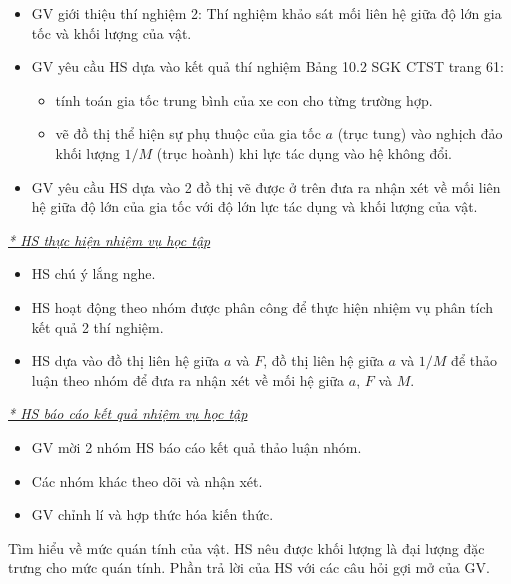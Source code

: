 {\begin{itemize}[label=-]
		\item GV giới thiệu thí nghiệm 2: Thí nghiệm khảo sát mối liên hệ giữa độ lớn gia tốc và khối lượng của vật.
		\item GV yêu cầu HS dựa vào kết quả thí nghiệm Bảng 10.2 SGK CTST trang 61:
		\begin{itemize}[label=$\bullet$]
			\item tính toán gia tốc trung bình của xe con cho từng trường hợp.
			\item vẽ đồ thị thể hiện sự phụ thuộc của gia tốc $a$ (trục tung) vào nghịch đảo khối lượng $1/M$ (trục hoành) khi lực tác dụng vào hệ không đổi.
		\end{itemize}
		\item GV yêu cầu HS dựa vào 2 đồ thị vẽ được ở trên đưa ra nhận xét về mối liên hệ giữa độ lớn của gia tốc với độ lớn lực tác dụng và khối lượng của vật.
	\end{itemize}
	\textit{\underline{* HS thực hiện nhiệm vụ học tập}}
	\begin{itemize}[label=-]
		\item HS chú ý lắng nghe.
		\item HS hoạt động theo nhóm được phân công để thực hiện nhiệm vụ phân tích kết quả 2 thí nghiệm.
		\item HS dựa vào đồ thị liên hệ giữa $a$ và $F$, đồ thị liên hệ giữa $a$ và $1/M$ để thảo luận theo nhóm để đưa ra nhận xét về mối hệ giữa $a$, $F$ và $M$.
	\end{itemize}
	\textit{\underline{* HS báo cáo kết quả nhiệm vụ học tập}}
	\begin{itemize}[label=-]
		\item GV mời 2 nhóm HS báo cáo kết quả thảo luận nhóm.
		\item Các nhóm khác theo dõi và nhận xét.
		\item GV chỉnh lí và hợp thức hóa kiến thức.
	\end{itemize}
}
\hoatdong
{Tìm hiểu về mức quán tính của vật.
}
{HS nêu được khối lượng là đại lượng đặc trưng cho mức quán tính.
}
{Phần trả lời của HS với các câu hỏi gợi mở của GV.
}
